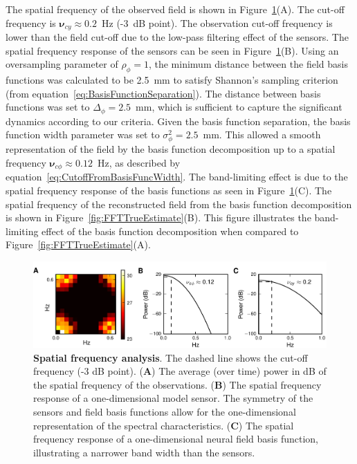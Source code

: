 \documentclass[10pt]{article}
\begin{document}
The spatial frequency of the observed field is shown in Figure~\ref{fig:ObservationFreqAnal}(A). The cut-off frequency is $\boldsymbol{\nu}_{cy} \approx 0.2$~Hz (-3~dB point). The observation cut-off frequency is lower than the field cut-off due to the low-pass filtering effect of the sensors. The spatial frequency response of the sensors can be seen in Figure~\ref{fig:ObservationFreqAnal}(B). Using an oversampling parameter of $\rho_{\phi}=1$, the minimum distance between the field basis functions was calculated to be 2.5~mm to satisfy Shannon's sampling criterion (from equation~\ref{eq:BasisFunctionSeparation}). The distance between basis functions was set to $\Delta_{\phi}=2.5$~mm, which is sufficient to capture the significant dynamics according to our criteria.
Given the basis function separation, the basis function width parameter was set to $\sigma_{\phi}^2=2.5$~mm. This allowed a smooth representation of the field by the basis function decomposition up to a spatial frequency $\boldsymbol{\nu}_{c\phi} \approx 0.12$~Hz, as described by equation~\ref{eq:CutoffFromBasisFuncWidth}. The band-limiting effect is due to the spatial frequency response of the basis functions as seen in Figure~\ref{fig:ObservationFreqAnal}(C). The spatial frequency of the reconstructed field from the basis function decomposition is shown in Figure~\ref{fig:FFTTrueEstimate}(B). This figure illustrates the band-limiting effect of the basis function decomposition when compared to Figure~\ref{fig:FFTTrueEstimate}(A).
\begin{figure}[!ht] 
	\begin{center}
		\includegraphics{./Graph/SensorBasisObsFrequencyResponse.pdf}	
	\end{center}
	\caption{{\bf Spatial frequency analysis}. The dashed line shows the cut-off frequency (-3 dB point). (\textbf{A}) The average (over time) power in dB of the spatial frequency of the observations. (\textbf{B}) The spatial frequency response of a one-dimensional model sensor. The symmetry of the sensors and field basis functions allow for the one-dimensional representation of the spectral characteristics. (\textbf{C}) The spatial frequency response of a one-dimensional neural field basis function, illustrating a narrower band width than the sensors.} 
	\label{fig:ObservationFreqAnal}
\end{figure}
\end{document}
